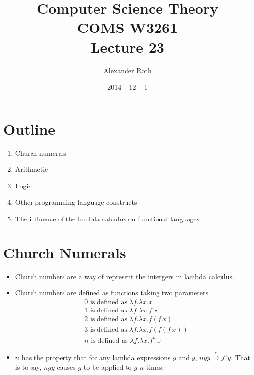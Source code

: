 \documentclass[]{article}
\begin{document}
\newtheorem{thm}{Theorem}
\title{Computer Science Theory \\ COMS W3261 \\ Lecture 23}
\author{Alexander Roth}
\date{2014 -- 12 -- 1}
\maketitle

\section*{Outline}
\begin{enumerate}
\item Church numerals
\item Arithmetic
\item Logic
\item Other programming language constructs
\item The influence of the lambda calculus on functional languages
\end{enumerate}

\section{Church Numerals}
\begin{itemize}
\item Church numbers are a way of represent the intergers in lambda calculus.
\item Church numbers are defined as functions taking two parameters
\begin{align*}
&0\,\,\textrm{is defined as}\,\,\lambda f.\lambda x.x \\
&1\,\,\textrm{is defined as}\,\,\lambda f.\lambda x.f\,x\\
&2\,\,\textrm{is defined as}\,\,\lambda f.\lambda x.f(f\,x)\\
&3\,\,\textrm{is defined as}\,\,\lambda f.\lambda x.f(f(f\,x))\\
&n\,\,\textrm{is defined as}\,\,\lambda f.\lambda x.f^n\,x
\end{align*}
\item $n$ has the property that for any lambda expressions $g$ and $y$, $ngy \overset{*}{\rightarrow} g^ny$. That is to say, $ngy$ causes $g$ to be applied to $y$ $n$ times.
\end{itemize}
\end{document}
